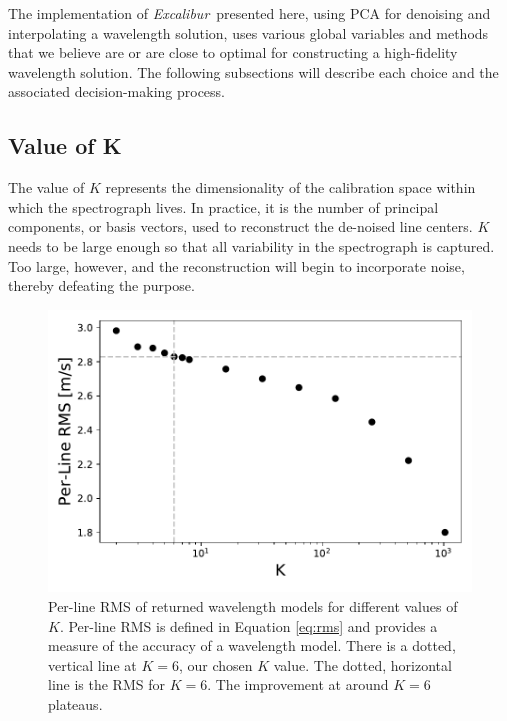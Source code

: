 \documentclass[modern]{aastex63}
\newcommand{\project}[1]{\textsl{#1}}
\newcommand{\name}{\project{Excalibur}}
\begin{document}
The implementation of \name\ presented here, using PCA for denoising and interpolating a wavelength solution, uses various global variables and methods that we believe are or are close to optimal for constructing a high-fidelity wavelength solution.  The following subsections will describe each choice and the associated decision-making process.

\subsection{Value of K}
\label{sec:choice_k}
The value of $K$ represents the dimensionality of the calibration space within which the spectrograph lives.  In practice, it is the number of principal components, or basis vectors, used to reconstruct the de-noised line centers.  $K$ needs to be large enough so that all variability in the spectrograph is captured.  Too large, however, and the reconstruction will begin to incorporate noise, thereby defeating the purpose.

\begin{figure}[h]
\centering
\includegraphics[width=.5\textwidth]{Figures/kvals_all.pdf}
\caption{Per-line RMS of returned wavelength models for different values of $K$.  Per-line RMS is defined in Equation \ref{eq:rms} and provides a measure of the accuracy of a wavelength model.  There is a dotted, vertical line at $K=6$, our chosen $K$ value.  The dotted, horizontal line is the RMS for $K=6$.  The improvement at around $K=6$ plateaus.}
\label{fig:kvals}
\end{figure}
\end{document}
